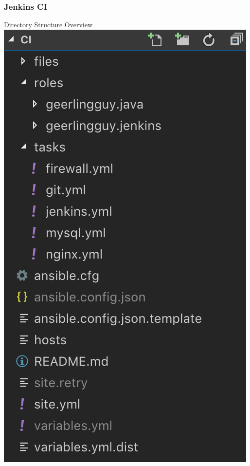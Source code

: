 \documentclass[12pt]{beamer}
\begin{document}
    \begin{frame}
        \frametitle{Jenkins CI}
        Directory Structure Overview
        \newline
   		\includegraphics[scale=.38]{assets/deploy_dirstruct_ci.png}
    \end{frame}
\end{document}
